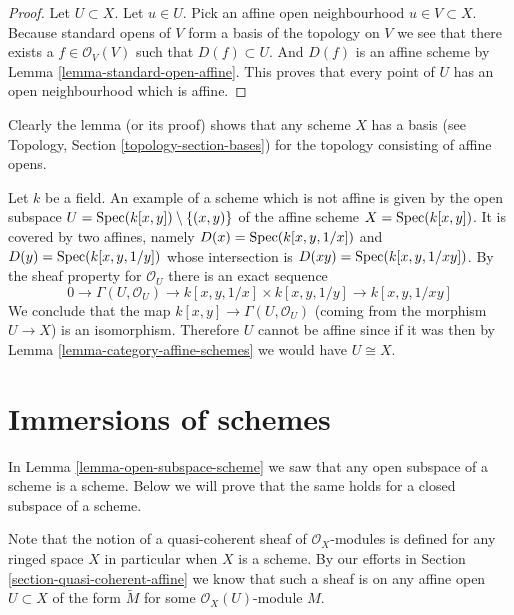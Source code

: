 \begin{proof}
Let $U \subset X$. Let $u \in U$.
Pick an affine open neighbourhood $u \in V \subset X$.
Because standard opens of $V$ form a basis of the topology
on $V$ we see that there exists a $f\in \mathcal{O}_V(V)$
such that $D(f) \subset U$. And $D(f)$ is an affine scheme
by Lemma \ref{lemma-standard-open-affine}. This proves that every point
of $U$ has an open neighbourhood which is affine.
\end{proof}

\noindent
Clearly the lemma (or its proof) shows that any scheme
$X$ has a basis (see Topology, Section \ref{topology-section-bases})
for the topology consisting of affine opens.

\begin{example}
\label{example-not-affine}
Let $k$ be a field.
An example of a scheme which is not affine is
given by the open subspace
$U = \mathop{\rm Spec}(k[x, y]) \setminus \{ (x, y)\}$
of the affine scheme $X =\mathop{\rm Spec}(k[x, y])$.
It is covered by two affines, namely $D(x) = \mathop{\rm Spec}(k[x, y, 1/x])$
and $D(y) = \mathop{\rm Spec}(k[x, y, 1/y])$ whose intersection is
$D(xy) = \mathop{\rm Spec}(k[x, y, 1/xy])$. By the sheaf property
for $\mathcal{O}_U$ there is an exact sequence
$$
0 \to
\Gamma(U, \mathcal{O}_U) \to
k[x, y, 1/x] \times k[x, y, 1/y] \to
k[x, y, 1/xy]
$$
We conclude that the map $k[x, y] \to \Gamma(U, \mathcal{O}_U)$
(coming from the morphism $U \to X$) is an isomorphism.
Therefore $U$ cannot be affine since if it was then by
Lemma \ref{lemma-category-affine-schemes} we would have $U \cong X$.
\end{example}











\section{Immersions of schemes}
\label{section-immersions}

\noindent
In Lemma \ref{lemma-open-subspace-scheme} we saw that any open subspace
of a scheme is a scheme. Below we will prove that the same holds for
a closed subspace of a scheme.

\medskip\noindent
Note that the notion of a quasi-coherent sheaf of $\mathcal{O}_X$-modules
is defined for any ringed space $X$ in particular when $X$ is a scheme.
By our efforts in Section \ref{section-quasi-coherent-affine} we
know that such a sheaf is on any affine open $U \subset X$
of the form $\widetilde M$ for some $\mathcal{O}_X(U)$-module $M$.

